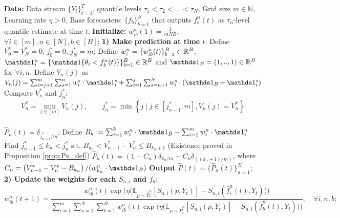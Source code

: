 \begin{algorithm}[h]
  \caption{Two-player game based multiple quantile level online omniprediction} \label{alg:omni-twoplayer_online_multi_q}
  \begin{algorithmic}[1]
  \State \textbf{Data:} Data stream $\{Y_t\}_{t=1}^T$, quantile levels $\tau_1 < \tau_2 < ... < \tau_N$, Grid size $m\in \mathbb{N}$, Learning rate $\eta> 0$, Base forecasters: $\{f_b\}_{b=1}^B$ that outputs $f_b^n(t)$ as $\tau_n$-level quantile estimate at time $t$;
  \State \textbf{Initialize:} $w_{ib}^n(1) = \frac{1}{mNB}$, $\forall i \in [m], n \in [N], b \in [B]$;
    \State \textbf{1) Make prediction at time $t$}:
      \State Define $V_0^* = V_N^* = 0$, $j_0^* = 0$, $j_N^* = m$;
      \State Define $w_i^n = \{w_{ib}^n(t)\}_{b=1}^B \in \mathbb{R}^B$, $\one_i^n = \{\indi{\theta_i < f_b^n(t)}\}_{b=1}^B \in \R^B$ and $\one_B = (1,..,1)\in \R^B$ for $\forall i, n$.
      \State Define $V_n(j)$ as 
        \(
        V_n(j) = \sum_{i=j+1}^{m} \sum_{s=1}^{n} w_i^s \cdot \one_i^s + \sum_{i=1}^{j} \sum_{s=n+1}^{N}  w_i^s \cdot (\one_B - \one_i^s)
        \)
      \State Compute $V_n^*$ and $j_n^*$:
        \begin{align} \label{eq:Vn_def_multi_q}
          V_n^* = \min_{j \in [m]} V_n(j), \qquad
          j_n^* = \min\left\{j \mid j\in [j_{n-1}^*, m],  V_n(j) = V_n^* \right\}
        \end{align}
      \EndFor \vspace{-0.2cm}\\
          \State $\hat{P}_n(t) = \delta_{j_{n-1}^*/m}$;
        \Else
          \State Define $B_k := \sum_{i=1}^{k} w_i^n \cdot \one_B - \sum_{i=1}^{m}w_i^n \cdot \one_i^n$
          \State Find $j_{n-1}^* \leq k_n < j_n^*$ s.t. $B_{k_n} < V_{n-1}^* - V_n^* \leq B_{k_n+1}$ (Existence proved in Proposition \ref{prop:Pn_def})
          \State $\hat{P}_n(t) = (1-C_n)\delta_{k_n/m} + C_n\delta_{((k_n+1)/m)}$, where $C_n = \left( V_{n-1}^* - V_n^* - B_{k_n} \right) / (w_{k_n}^n \cdot \one_B)$
        \EndIf
      \EndFor
      \State \textbf{Output} $\hat{P}(t) = \{\hat{P}_n(t)\}_{n=1}^N$;  \vspace{-0.1cm}\\
      \State \textbf{2) Update the weights for each $S_{n,i}$ and $f_b$}:
          \[
          w_{ib}^n(t+1) 
          = \frac{w_{ib}^n(t) \exp\bigl(\eta \big(\mathbb{E}_{p \sim \hat{P}_t^n}[S_{n,i}(p, Y_t)] 
          - S_{n,i}(\hat{f}_i^n(t), Y_t)\big)\bigr)}
          {\sum_{i=1}^{m} \sum_{n=1}^N \sum_{b=1}^B w_{ib}^n(t) \exp\bigl(\eta \big(\mathbb{E}_{p \sim \hat{P}_t^n}[S_{n,i}(p, Y_t)] - S_{n,i}(\hat{f}_b^n(t), Y_t)\big)\bigr)}, \quad \forall i, n, b;
          \]
  \EndFor
  \end{algorithmic}
\end{algorithm}



